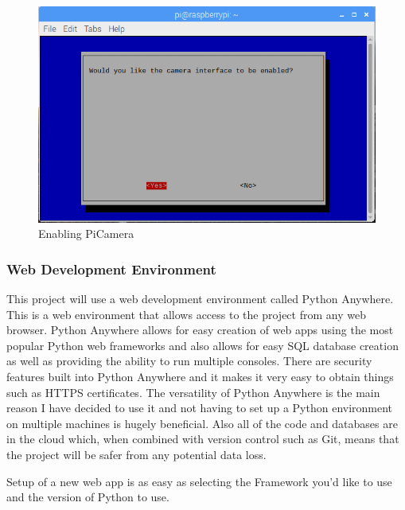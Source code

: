 \documentclass[10pt,a4paper]{article}
\begin{document}
\begin{figure}[H]
\centering
  \includegraphics[width=\linewidth]{images/picamera.png}
  \caption{Enabling PiCamera}
  \label{fig:picamera}
\end{figure}

\subsubsection{Web Development Environment}
This project will use a web development environment called Python Anywhere. This is a web environment that allows access to the project from any web browser. Python Anywhere allows for easy creation of web apps using the most popular Python web frameworks and also allows for easy SQL database creation as well as providing the ability to run multiple consoles. There are security features built into Python Anywhere and it makes it very easy to obtain things such as HTTPS certificates. The versatility of Python Anywhere is the main reason I have decided to use it and not having to set up a Python environment on multiple machines is hugely beneficial. Also all of the code and databases are in the cloud which, when combined with version control such as Git, means that the project will be safer from any potential data loss.

Setup of a new web app is as easy as selecting the Framework you'd like to use and the version of Python to use.
\end{document}
